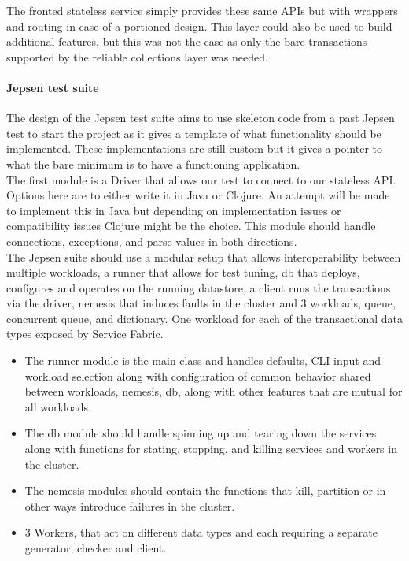 \documentclass[a4paper,10pt,titlepage]{report}
\begin{document}
    The fronted stateless service simply provides these same APIs but with wrappers and routing in case of a portioned design. This layer could also be used to build additional features, but this was not the case as only the bare transactions supported by the reliable collections layer was needed.

    \paragraph*{Jepsen test suite}
    
    The design of the Jepsen test suite aims to use skeleton code from a past Jepsen test to start the project as it gives a template of what functionality should be implemented. These implementations are still custom but it gives a pointer to what the bare minimum is to have a functioning application.
    \\
    The first module is a Driver that allows our test to connect to our stateless API. Options here are to either write it in Java or Clojure. An attempt will be made to implement this in Java but depending on implementation issues or compatibility issues Clojure might be the choice. This module should handle connections, exceptions, and parse values in both directions.
    \\
    The Jepsen suite should use a modular setup that allows interoperability between multiple workloads, a runner that allows for test tuning, db that deploys, configures and operates on the running datastore, a client runs the transactions via the driver, nemesis that induces faults in the cluster and 3 workloads, queue, concurrent queue, and dictionary. One workload for each of the transactional data types exposed by Service Fabric.
    \begin{itemize}
        \item The runner module is the main class and handles defaults, CLI input and workload selection along with configuration of common behavior shared between workloads, nemesis, db, along with other features that are mutual for all workloads.
        \item   The db module should handle spinning up and tearing down the services along with functions for stating, stopping, and killing services and workers in the cluster.

  \item  The nemesis modules should contain the functions that kill, partition or in other ways introduce failures in the cluster.

  \item 3 Workers, that act on different data types and each requiring a separate generator, checker and client.
    \end{itemize}
    
\end{document}
